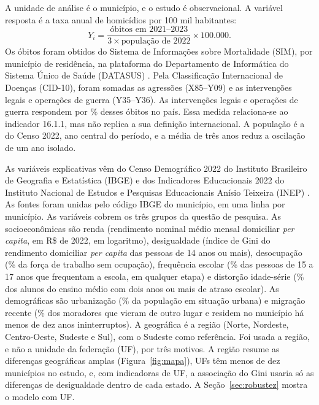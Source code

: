 \documentclass[a4paper,11pt]{article}
\begin{document}
A unidade de análise é o município, e o estudo é observacional. A variável resposta é a taxa anual de homicídios por 100 mil habitantes:
\[
Y_i = \frac{\text{óbitos em 2021--2023}}{3 \times \text{população de 2022}} \times 100{.}000.
\]
Os óbitos foram obtidos do Sistema de Informações sobre Mortalidade (SIM), por município de residência, na plataforma do Departamento de Informática do Sistema Único de Saúde (DATASUS) \citep{datasus2025}. Pela Classificação Internacional de Doenças (CID-10), foram somadas as agressões (X85--Y09) e as intervenções legais e operações de guerra (Y35--Y36). As intervenções legais e operações de guerra respondem por \nPctIntervencao\% desses óbitos no país. Essa medida relaciona-se ao indicador 16.1.1, mas não replica a sua definição internacional. A população é a do Censo 2022, ano central do período, e a média de três anos reduz a oscilação de um ano isolado.

As variáveis explicativas vêm do Censo Demográfico 2022 do Instituto Brasileiro de Geografia e Estatística (IBGE) \citep{ibge2023censo} e dos Indicadores Educacionais 2022 do Instituto Nacional de Estudos e Pesquisas Educacionais Anísio Teixeira (INEP) \citep{inep2023}. As fontes foram unidas pelo código IBGE do município, em uma linha por município. As variáveis cobrem os três grupos da questão de pesquisa. As socioeconômicas são renda (rendimento nominal médio mensal domiciliar \textit{per capita}, em R\$ de 2022, em logaritmo), desigualdade (índice de Gini do rendimento domiciliar \textit{per capita} das pessoas de 14 anos ou mais), desocupação (\% da força de trabalho sem ocupação), frequência escolar (\% das pessoas de 15 a 17 anos que frequentam a escola, em qualquer etapa) e distorção idade-série (\% dos alunos do ensino médio com dois anos ou mais de atraso escolar). As demográficas são urbanização (\% da população em situação urbana) e migração recente (\% dos moradores que vieram de outro lugar e residem no município há menos de dez anos ininterruptos). A geográfica é a região (Norte, Nordeste, Centro-Oeste, Sudeste e Sul), com o Sudeste como referência. Foi usada a região, e não a unidade da federação (UF), por três motivos. A região resume as diferenças geográficas amplas (Figura~\ref{fig:mapa}), \nUFpoucos{} UFs têm menos de dez municípios no estudo, e, com indicadoras de UF, a associação do Gini usaria só as diferenças de desigualdade dentro de cada estado. A Seção~\ref{sec:robustez} mostra o modelo com UF.
\end{document}
